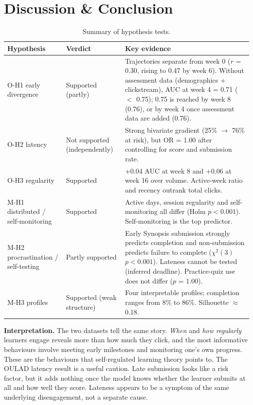 \documentclass[10pt,a4paper]{article}
\begin{document}
\section{Discussion \& Conclusion}
\begin{table}[H]
\centering\footnotesize
\begin{tabularx}{\textwidth}{>{\raggedright\arraybackslash}p{3.3cm}>{\raggedright\arraybackslash}p{2.6cm}L}
\toprule
\textbf{Hypothesis} & \textbf{Verdict} & \textbf{Key evidence} \\
\midrule
O-H1 early divergence & Supported (partly) & Trajectories separate from week 0 ($r$ = 0.30, rising to 0.47 by week 6).
Without assessment data (demographics + clickstream), AUC at week 4 = 0.71 ($<$ 0.75); 0.75 is reached by week 8 (0.76), or by week 4 once assessment
data are added (0.76). \\
O-H2 latency & Not supported (independently) & Strong bivariate gradient (25\% $\rightarrow$ 76\% at risk), but
OR = 1.00 after controlling for score and submission rate. \\
O-H3 regularity & Supported & +0.04 AUC at week 8 and +0.06 at week 16 over volume. Active-week ratio and recency
outrank total clicks. \\
M-H1 distributed / self-monitoring & Supported & Active days, session regularity and self-monitoring all differ
(Holm $p < 0.001$). Self-monitoring is the top predictor. \\
M-H2 procrastination / self-testing & Partly supported & Early Synopsis submission strongly predicts completion and non-submission
predicts failure to complete ($\chi^2(3)$ $p < 0.001$). Lateness cannot be tested (inferred deadline).
Practice-quiz use does not differ ($p$ = 1.00). \\
M-H3 profiles & Supported (weak structure) & Four interpretable profiles; completion ranges from 8\% to 86\%.
Silhouette $\approx$ 0.18. \\
\bottomrule
\end{tabularx}
\caption{Summary of hypothesis tests.}
\end{table}

\textbf{Interpretation.} The two datasets tell the same story. \emph{When} and \emph{how regularly} learners engage
reveals more than how much they click, and the most informative behaviours involve meeting early milestones and
monitoring one's own progress. These are the behaviours that self-regulated learning theory points to. The OULAD
latency result is a useful caution. Late submission looks like a risk factor, but it adds nothing once the model
knows whether the learner submits at all and how well they score. Lateness appears to be a symptom of the same
underlying disengagement, not a separate cause.
\end{document}

